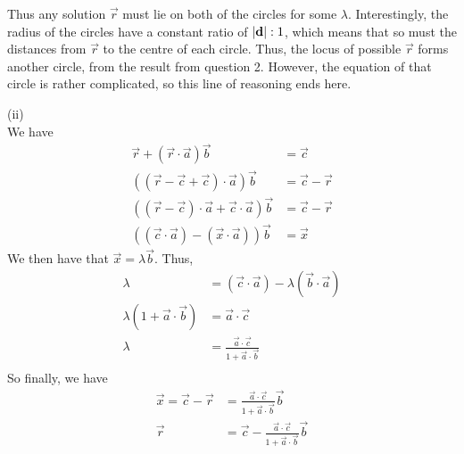 \documentclass[12pt]{article}
\begin{document}
\begin{answer}
        Thus any solution $\vec{r}$ must lie on both of
        the circles for some $\lambda$. Interestingly,
        the radius of the circles have a constant ratio of $\left\lvert \mathbf{d} \right\rvert:1$,
        which means that so must the distances from $\vec{r}$ to the centre
        of each circle. Thus, the locus of possible $\vec{r}$ forms another circle,
        from the result from question 2. However, the equation of that
        circle is rather complicated, so this line of reasoning ends here.

        (ii)\\
        We have
        \begin{align*}
            \vec{r} + (\vec{r}\cdot\vec{a})\vec{b} &= \vec{c}\\
            ((\vec{r} - \vec{c} + \vec{c})\cdot\vec{a})\vec{b} &= \vec{c} - \vec{r}\\
            ((\vec{r} - \vec{c})\cdot\vec{a} + \vec{c}\cdot\vec{a})\vec{b}
            &= \vec{c} - \vec{r}\\
            ((\vec{c}\cdot\vec{a}) - (\vec{x}\cdot\vec{a}))\vec{b} &= \vec{x}
        \end{align*}
        We then have that $\vec{x} = \lambda \vec{b}$. Thus,
        \begin{align*}
            \lambda &= (\vec{c}\cdot\vec{a}) - \lambda(\vec{b}\cdot\vec{a})\\
            \lambda(1 + \vec{a}\cdot\vec{b}) &= \vec{a}\cdot\vec{c}\\
            \lambda &= \frac{\vec{a}\cdot\vec{c}}{1 + \vec{a}\cdot\vec{b}}\\
        \end{align*}
        So finally, we have
        \begin{align*}
        \vec{x} = \vec{c}-\vec{r} 
        &= \frac{\vec{a}\cdot\vec{c}}{1 + \vec{a}\cdot\vec{b}}\vec{b}\\
        \vec{r}
        &= \vec{c} - \frac{\vec{a}\cdot\vec{c}}{1 + \vec{a}\cdot\vec{b}}\vec{b}
        \end{align*}
    \end{answer}
\end{document}
